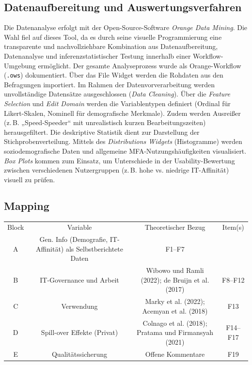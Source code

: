 \subsection{Datenaufbereitung und Auswertungsverfahren}
Die Datenanalyse erfolgt mit der Open-Source-Software \textit{Orange Data Mining}. Die Wahl fiel auf dieses Tool, da es durch seine visuelle Programmierung eine transparente und nachvollziehbare Kombination aus Datenaufbereitung, Datenanalyse und inferenzstatistischer Testung innerhalb einer Workflow-Umgebung ermöglicht. Der gesamte Analyseprozess wurde als Orange-Workflow (\texttt{.ows}) dokumentiert.
Über das File Widget werden die Rohdaten aus den Befragungen importiert. Im Rahmen der Datenvorverarbeitung werden unvollständige Datensätze ausgeschlossen (\textit{Data Cleaning}). Über die \textit{Feature Selection} und \textit{Edit Domain} werden die Variablentypen definiert (Ordinal für Likert-Skalen, Nominell für demografische Merkmale). Zudem werden Ausreißer (z.\,B. „Speed-Speeder“ mit unrealistisch kurzen Bearbeitungszeiten) herausgefiltert.
Die deskriptive Statistik dient zur Darstellung der Stichprobenverteilung. Mittels des \textit{Distributions Widgets} (Histogramme) werden soziodemografische Daten und allgemeine MFA-Nutzungshäufigkeiten visualisiert. \textit{Box Plots} kommen zum Einsatz, um Unterschiede in der Usability-Bewertung zwischen verschiedenen Nutzergruppen (z.\,B. hohe vs. niedrige IT-Affinität) visuell zu prüfen.

\subsection{Mapping}
\begin{center}
\begin{tabular}{c c c c} 
Block & Variable & Theoretischer Bezug & Item(s) \\
A & Gen. Info (Demografie, IT-Affinität) als Selbstberichtete Daten & F1–F7  \\
B & IT-Governance und Arbeit & Wibowo und Ramli (2022); de Bruijn et al. (2017) & F8–F12 \\
C & Verwendung & Marky et al. (2022); Acemyan et al. (2018) & F13 \\
D & Spill-over Effekte (Privat) & Colnago et al. (2018); Pratama und Firmansyah (2021) & F14–F17 \\
E & Qualitätssicherung & Offene Kommentare & F19 \\
\end{tabular}
\end{center}

